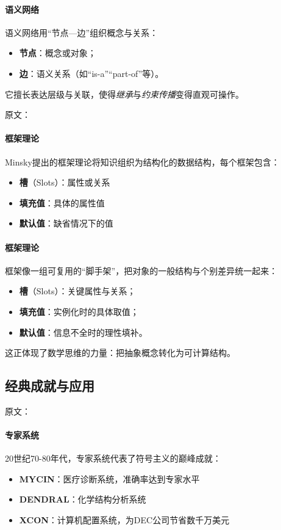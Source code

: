 \paragraph{语义网络}
语义网络用“节点—边”组织概念与关系：
\begin{itemize}
\item \textbf{节点}：概念或对象；
\item \textbf{边}：语义关系（如“is-a”“part-of”等）。
\end{itemize}
它擅长表达层级与关联，使得\emph{继承}与\emph{约束传播}变得直观可操作。

原文：
\paragraph{框架理论}
Minsky提出的框架理论将知识组织为结构化的数据结构，每个框架包含：
\begin{itemize}
\item \textbf{槽}（Slots）：属性或关系
\item \textbf{填充值}：具体的属性值
\item \textbf{默认值}：缺省情况下的值
\end{itemize}
\paragraph{框架理论}
框架像一组可复用的“脚手架”，把对象的一般结构与个别差异统一起来：
\begin{itemize}
\item \textbf{槽}（Slots）：关键属性与关系；
\item \textbf{填充值}：实例化时的具体取值；
\item \textbf{默认值}：信息不全时的理性填补。
\end{itemize}
这正体现了数学思维的力量：把抽象概念转化为可计算结构。


\subsection{经典成就与应用}

原文：
\paragraph{专家系统}
20世纪70-80年代，专家系统代表了符号主义的巅峰成就：
\begin{itemize}
\item \textbf{MYCIN}：医疗诊断系统，准确率达到专家水平
\item \textbf{DENDRAL}：化学结构分析系统
\item \textbf{XCON}：计算机配置系统，为DEC公司节省数千万美元
\end{itemize}
